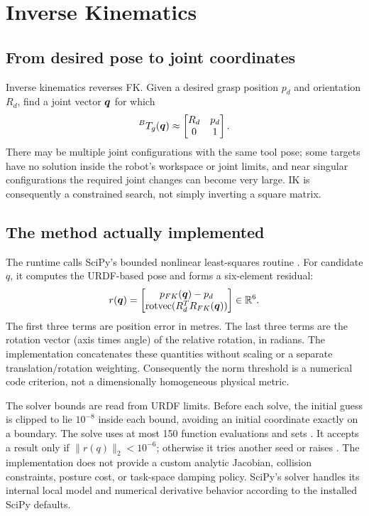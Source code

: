 \chapter{Inverse Kinematics}
\label{ch:ik}

\section{From desired pose to joint coordinates}
Inverse kinematics reverses FK. Given a desired grasp position $p_d$ and
orientation $R_d$, find a joint vector $\bm{q}$ for which
\begin{equation}
 {}^BT_g(\bm{q})\approx
 \begin{bmatrix}R_d&p_d\\0&1\end{bmatrix}.
\end{equation}
There may be multiple joint configurations with the same tool pose; some
targets have no solution inside the robot's workspace or joint limits, and
near singular configurations the required joint changes can become very
large. IK is consequently a constrained search, not simply inverting a square
matrix.

\section{The method actually implemented}
The runtime calls SciPy's bounded nonlinear least-squares routine
. For candidate $q$, it computes the
URDF-based pose and forms a six-element residual:
\begin{equation}
 r(\bm{q})=
 \begin{bmatrix}
 p_{FK}(\bm{q})-p_d\\
 \mathrm{rotvec}(R_d^TR_{FK}(\bm{q}))
 \end{bmatrix}\in\mathbb{R}^6.
 \label{eq:ik-residual}
\end{equation}
The first three terms are position error in metres. The last three terms are
the rotation vector (axis times angle) of the relative rotation, in radians.
The implementation concatenates these quantities without scaling or a
separate translation/rotation weighting. Consequently the norm threshold is
a numerical code criterion, not a dimensionally homogeneous physical metric.

The solver bounds are read from URDF limits. Before each solve, the initial
guess is clipped to lie $10^{-8}$ inside each bound, avoiding an initial
coordinate exactly on a boundary. The solve uses at most 150 function
evaluations and sets . It accepts a result only if
$\|r(q)\|_2<10^{-6}$; otherwise it tries another seed or raises
. The implementation does not provide a custom analytic
Jacobian, collision constraints, posture cost, or task-space damping policy.
SciPy's solver handles its internal local model and numerical derivative
behavior according to the installed SciPy defaults.

